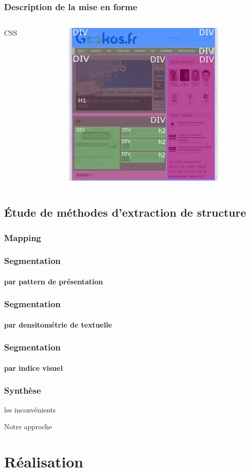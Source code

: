 \documentclass[]{beamer}
\begin{document}
\begin{frame}
\frametitle{Description de la mise en forme}
\begin{columns}
	\begin{column}{4cm}
	\begin{block}{CSS}
	\end{block}
	\end{column}
	\begin{column}{4cm}
	\includegraphics[scale=0.5]{img/architecture_HTML4.jpg}
	\end{column}
\end{columns}\end{frame}
\subsection{Étude de méthodes d'extraction de structure}
\begin{frame}
\frametitle{Mapping}
\end{frame}

\begin{frame}
\frametitle{Segmentation}
\framesubtitle{par pattern de présentation}
\end{frame}

\begin{frame}
\frametitle{Segmentation}
\framesubtitle{par densitométrie de textuelle }
\end{frame}

\begin{frame}
\frametitle{Segmentation}
\framesubtitle{par indice visuel}
\end{frame}

\begin{frame}
\frametitle{Synthèse}
\begin{block}{}
les inconvénients
\end{block}
\begin{block}{Notre approche}
\end{block}
\end{frame}

\section{Réalisation}
\begin{frame}
\end{frame}




 
\end{document}
